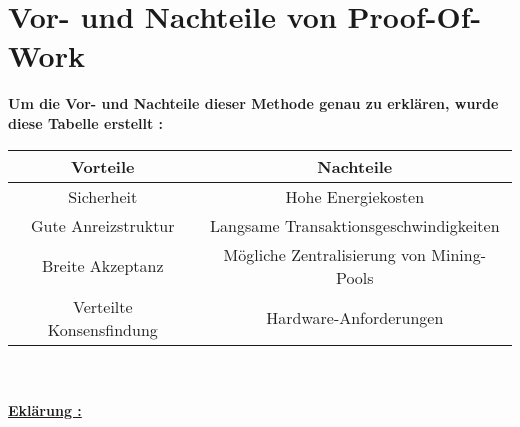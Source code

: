 \section{Vor- und Nachteile von Proof-Of-Work}
\textbf{Um die Vor- und Nachteile dieser Methode genau zu erklären, wurde diese Tabelle erstellt : }  \\
\begin{tabular}{|c|c|}
	\hline
	\textbf{Vorteile} & \textbf{Nachteile} \\ \hline
	Sicherheit & Hohe Energiekosten \\ \hline
	Gute Anreizstruktur & Langsame Transaktionsgeschwindigkeiten \\ \hline
	Breite Akzeptanz & Mögliche Zentralisierung von Mining-Pools \\ \hline
	Verteilte Konsensfindung & Hardware-Anforderungen \\ \hline
\end{tabular}\\ \\
\textbf{\underline{Eklärung :}}
